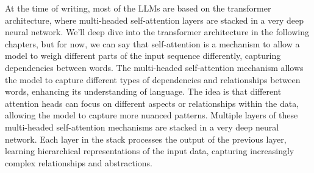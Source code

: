 At the time of writing, most of the LLMs are based on the transformer architecture, where multi-headed self-attention layers are stacked in a very deep neural network.
We'll deep dive into the transformer architecture in the following chapters, but for now, we can say that self-attention is a mechanism to allow a model to weigh different parts of the input sequence differently, capturing dependencies between words.
The multi-headed self-attention mechanism allows the model to capture different types of dependencies and relationships between words, enhancing its understanding of language.
The idea is that different attention heads can focus on different aspects or relationships within the data, allowing the model to capture more nuanced patterns.
Multiple layers of these multi-headed self-attention mechanisms are stacked in a very deep neural network.
Each layer in the stack processes the output of the previous layer, learning hierarchical representations of the input data, capturing increasingly complex relationships and abstractions.

